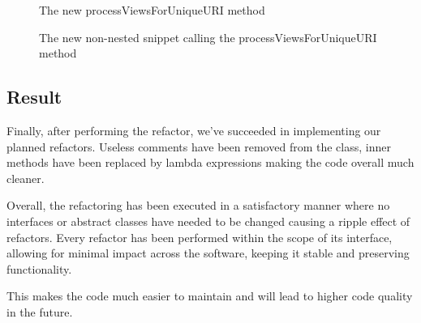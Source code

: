 \begin{figure}[H]
  
  \caption{The new processViewsForUniqueURI method}
\end{figure}

\begin{figure}[H]
  
  \caption{The new non-nested snippet calling the processViewsForUniqueURI method}
\end{figure}


\subsection{Result}
Finally, after performing the refactor, we've succeeded in implementing our planned refactors. Useless comments have been removed from the class, inner methods have been replaced by lambda expressions making the code overall much cleaner.

Overall, the refactoring has been executed in a satisfactory manner where no interfaces or abstract classes have needed to be changed causing a ripple effect of refactors. Every refactor has been performed within the scope of its interface, allowing for minimal impact across the software, keeping it stable and preserving functionality.

This makes the code much easier to maintain and will lead to higher code quality in the future.